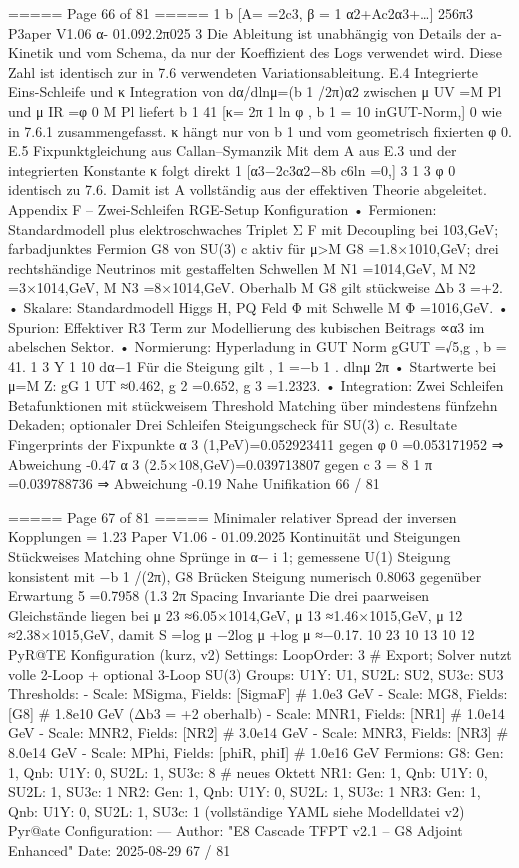 \begin{MyVerbatim}
{{===== Page 66 of 81 =====
1 b
[A= =2c3, β = 1 α2+Ac2α3+…]
256π3 P3aper V1.06 α- 01.092.2π025 3
Die Ableitung ist unabhängig von Details der a-Kinetik und vom Schema, da nur der Koeffizient des Logs verwendet
wird. Diese Zahl ist identisch zur in 7.6 verwendeten Variationsableitung.
E.4 Integrierte Eins-Schleife und κ
Integration von dα/dlnμ=(b 1 /2π)α2 zwischen μ UV =M Pl und μ IR =φ 0 M Pl liefert
b 1 41
[κ=
2π
1 ln
φ
, b
1
=
10
inGUT-Norm,]
0
wie in 7.6.1 zusammengefasst. κ hängt nur von b 1 und vom geometrisch fixierten φ 0.
E.5 Fixpunktgleichung aus Callan–Symanzik
Mit dem A aus E.3 und der integrierten Konstante κ folgt direkt
1
[α3−2c3α2−8b c6ln =0,]
3 1 3 φ
0
identisch zu 7.6. Damit ist A vollständig aus der effektiven Theorie abgeleitet.
Appendix F – Zwei-Schleifen RGE-Setup
Konfiguration
• Fermionen: Standardmodell plus elektroschwaches Triplet Σ F mit Decoupling bei 103,GeV; farbadjunktes Fermion G8
von SU(3) c aktiv für μ>M G8 =1.8×1010,GeV; drei rechtshändige Neutrinos mit gestaffelten Schwellen
M N1 =1014,GeV, M N2 =3×1014,GeV, M N3 =8×1014,GeV. Oberhalb M G8 gilt stückweise Δb 3 =+2.
• Skalare: Standardmodell Higgs H, PQ Feld Φ mit Schwelle M Φ =1016,GeV.
• Spurion: Effektiver R3 Term zur Modellierung des kubischen Beitrags ∝α3 im abelschen Sektor.
• Normierung: Hyperladung in GUT Norm
gGUT =√5,g , b = 41.
1 3 Y 1 10
dα−1
Für die Steigung gilt , 1 =−b 1 .
dlnμ 2π
• Startwerte bei μ=M Z:
gG
1
UT ≈0.462, g
2
=0.652, g
3
=1.2323.
• Integration: Zwei Schleifen Betafunktionen mit stückweisem Threshold Matching über mindestens fünfzehn Dekaden;
optionaler Drei Schleifen Steigungscheck für SU(3) c.
Resultate
Fingerprints der Fixpunkte
α 3 (1,PeV)=0.052923411 gegen φ 0 =0.053171952 ⇒ Abweichung -0.47%
α 3 (2.5×108,GeV)=0.039713807 gegen c 3 = 8 1 π =0.039788736 ⇒ Abweichung -0.19%
Nahe Unifikation
66 / 81

===== Page 67 of 81 =====
Minimaler relativer Spread der inversen Kopplungen = 1.23 %
Paper V1.06 - 01.09.2025
Kontinuität und Steigungen
Stückweises Matching ohne Sprünge in α− i 1; gemessene U(1) Steigung konsistent mit −b 1 /(2π), G8 Brücken Steigung
numerisch 0.8063 gegenüber Erwartung 5 =0.7958 (1.3%
2π
Spacing Invariante
Die drei paarweisen Gleichstände liegen bei
μ
23
≈6.05×1014,GeV,
μ
13
≈1.46×1015,GeV,
μ
12
≈2.38×1015,GeV,
damit
S =log μ −2log μ +log μ ≈−0.17.
10 23 10 13 10 12
PyR@TE Konfiguration (kurz, v2)
Settings:
LoopOrder: 3 # Export; Solver nutzt volle 2-Loop + optional 3-Loop SU(3)
Groups: {U1Y: U1, SU2L: SU2, SU3c: SU3}
Thresholds:
- {Scale: MSigma, Fields: [SigmaF]} # 1.0e3 GeV
- {Scale: MG8, Fields: [G8]} # 1.8e10 GeV (Δb3 = +2 oberhalb)
- {Scale: MNR1, Fields: [NR1]} # 1.0e14 GeV
- {Scale: MNR2, Fields: [NR2]} # 3.0e14 GeV
- {Scale: MNR3, Fields: [NR3]} # 8.0e14 GeV
- {Scale: MPhi, Fields: [phiR, phiI]} # 1.0e16 GeV
Fermions:
G8: {Gen: 1, Qnb: {U1Y: 0, SU2L: 1, SU3c: 8}} # neues Oktett
NR1: {Gen: 1, Qnb: {U1Y: 0, SU2L: 1, SU3c: 1}}
NR2: {Gen: 1, Qnb: {U1Y: 0, SU2L: 1, SU3c: 1}}
NR3: {Gen: 1, Qnb: {U1Y: 0, SU2L: 1, SU3c: 1}}
(vollständige YAML siehe Modelldatei v2)
Pyr@ate Configuration:
---
Author: "E8 Cascade TFPT v2.1 – G8 Adjoint Enhanced"
Date: 2025-08-29
67 / 81

}}
\end{MyVerbatim}
